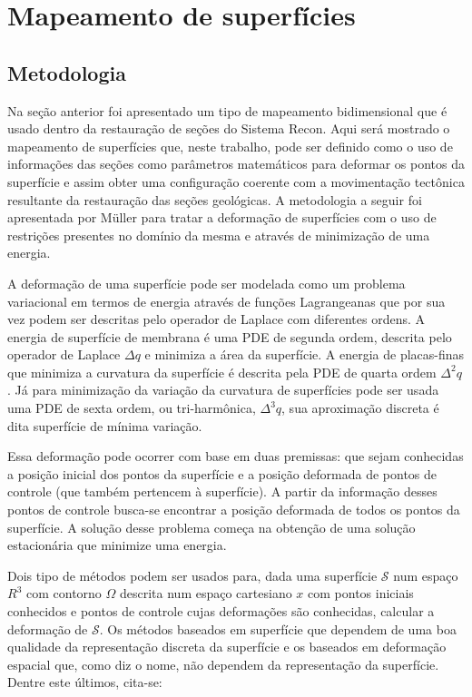 
\section{Mapeamento de superfícies}

\subsection{Metodologia}\label{surface-mapping-metodology}

Na seção anterior foi apresentado um tipo de mapeamento bidimensional que é usado dentro da restauração de seções do Sistema Recon. Aqui será mostrado o mapeamento de superfícies que, neste trabalho, pode ser definido como o uso de informações das seções como parâmetros matemáticos para deformar os pontos da superfície e assim obter uma configuração coerente com a movimentação tectônica resultante da restauração das seções geológicas. A metodologia a seguir foi apresentada por Müller\cite{Muller} para tratar a deformação de superfícies com o uso de restrições presentes no domínio da mesma e através de minimização de uma energia.

A deformação de uma superfície pode ser modelada como um problema variacional em termos de energia através de funções Lagrangeanas que por sua vez podem ser descritas pelo operador de Laplace com diferentes ordens. A energia de superfície de membrana é uma PDE de segunda ordem, descrita pelo operador de Laplace $\Delta{q}$ e minimiza a área da superfície. A energia de placas-finas que minimiza a curvatura da superfície é descrita pela PDE de quarta ordem $\Delta^2{q}$. Já para minimização da variação da curvatura de superfícies pode ser usada uma PDE de sexta ordem, ou tri-harmônica, $\Delta^3{q}$, sua aproximação discreta é dita superfície de mínima variação.\cite{Muller, Botsch}

Essa deformação pode ocorrer com base em duas premissas: que sejam conhecidas a posição inicial dos pontos da superfície e a posição deformada de pontos de controle (que também pertencem à superfície). A partir da informação desses pontos de controle busca-se encontrar a posição deformada de todos os pontos da superfície. A solução desse problema começa na obtenção de uma solução estacionária que minimize uma energia.\cite{Muller}

Dois tipo de métodos podem ser usados para, dada uma superfície $\mathcal{S}$ num espaço $R^3$ com contorno $\Omega$ descrita num espaço cartesiano $x$ com pontos iniciais conhecidos e pontos de controle cujas deformações são conhecidas, calcular a deformação de $\mathcal{S}$. Os métodos baseados em superfície que dependem de uma boa qualidade da representação discreta da superfície e os baseados em deformação espacial que, como diz o nome, não dependem da representação da superfície.\cite{Botsch} Dentre este últimos, cita-se: 

